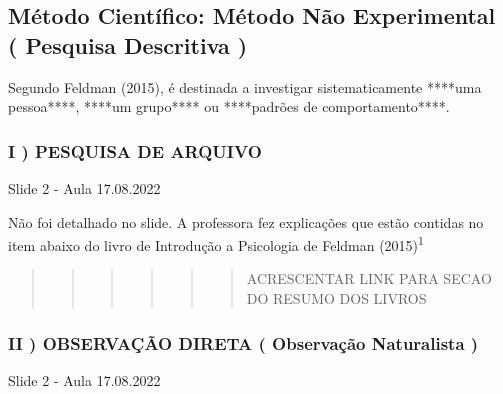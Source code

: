 \documentclass[
]{book}
\begin{document}
\hypertarget{muxe9todo-cientuxedfico-muxe9todo-nuxe3o-experimental-pesquisa-descritiva}{%
\subsection{Método Científico: Método Não Experimental ( Pesquisa Descritiva )}\label{muxe9todo-cientuxedfico-muxe9todo-nuxe3o-experimental-pesquisa-descritiva}}

Segundo Feldman (2015), é destinada a investigar sistematicamente ****uma pessoa****, ****um grupo**** ou ****padrões de comportamento****.

\hypertarget{i-pesquisa-de-arquivo}{%
\subsubsection{I ) PESQUISA DE ARQUIVO}\label{i-pesquisa-de-arquivo}}

Slide 2 - Aula 17.08.2022

Não foi detalhado no slide. A professora fez explicações que estão contidas no item abaixo do livro de Introdução a Psicologia de Feldman (2015)\textsuperscript{1}

\begin{quote}
\begin{quote}
\begin{quote}
\begin{quote}
\begin{quote}
\begin{quote}
ACRESCENTAR LINK PARA SECAO DO RESUMO DOS LIVROS
\end{quote}
\end{quote}
\end{quote}
\end{quote}
\end{quote}
\end{quote}

\hypertarget{ii-observauxe7uxe3o-direta-observauxe7uxe3o-naturalista}{%
\subsubsection{II ) OBSERVAÇÃO DIRETA ( Observação Naturalista )}\label{ii-observauxe7uxe3o-direta-observauxe7uxe3o-naturalista}}

Slide 2 - Aula 17.08.2022
\end{document}

